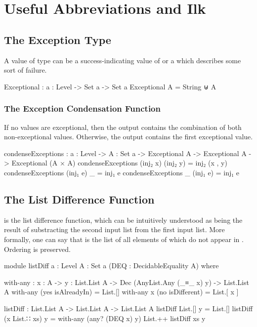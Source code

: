 \documentclass{report}
\begin{document}
\chapter{Useful Abbreviations and Ilk}

\section{The Exception Type}
A value of type   can be a success-indicating value of  or a  which describes some sort of failure.

\begin{code}
Exceptional : {a : Level} -> Set a -> Set a
Exceptional A = String ⊎ A
\end{code}

\subsection{The Exception Condensation Function}
If no values are exceptional, then the output contains the combination of both non-exceptional values.  Otherwise, the output contains the first exceptional value.

\begin{code}
condenseExceptions : {a : Level} ->
                     {A : Set a} ->
                     Exceptional A ->
                     Exceptional A ->
                     Exceptional (A × A)
condenseExceptions (inj₂ x) (inj₂ y) = inj₂ (x , y)
condenseExceptions (inj₁ e) _ = inj₁ e
condenseExceptions _ (inj₁ e) = inj₁ e
\end{code}

\section{The List Difference Function}
 is the list difference function, which can be intuitively understood as being the result of substracting the second input list from the first input list.  More formally, one can say that    is the list of all elements of  which do not appear in .  Ordering is preserved.

\begin{code}
module listDiff
  {a : Level}
  {A : Set a}
  (DEQ : DecidableEquality A) where

  with-any : {x : A} ->
             {y : List.List A} ->
             Dec (AnyList.Any (_≡_ x) y) ->
             List.List A
  with-any (yes isAlreadyIn) = List.[]
  with-any {x} (no isDifferent) = List.[ x ]

  listDiff : List.List A -> List.List A -> List.List A
  listDiff List.[] y = List.[]
  listDiff (x List.∷ xs) y = with-any (any? (DEQ x) y) List.++ listDiff xs y
\end{code}
\end{document}

